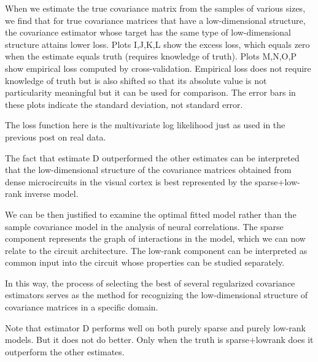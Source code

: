 When we estimate the true covariance matrix from the samples of various sizes, we find that for true covariance matrices that have a low-dimensional structure, the covariance estimator whose target has the same type of low-dimensional structure attains lower loss. Plots I,J,K,L show the excess loss, which equals zero when the estimate equals truth (requires knowledge of truth). Plots M,N,O,P show empirical loss computed by cross-validation.  Empirical loss does not require knowledge of truth but is also shifted so that its absolute value is not particularity meaningful but it can be used for comparison. The error bars in these plots indicate the standard deviation, not standard error.

The loss function here is the multivariate log likelihood just as used in the previous post on real data. 

The fact that estimate D outperformed the other estimates can be interpreted that the low-dimensional structure of the covariance matrices obtained from dense microcircuits in the visual cortex is best represented by the sparse+low-rank inverse model. 

We can be then justified to examine the optimal fitted model rather than the sample covariance model in the analysis of neural correlations.  The sparse component represents the graph of interactions in the model, which we can now relate to the circuit architecture.  The low-rank component can be interpreted as common input into the circuit whose properties can be studied separately.

In this way, the process of selecting the best of several regularized covariance estimators serves as the method for recognizing the low-dimensional structure of covariance matrices in a specific domain. 

Note that estimator D performs well on both purely sparse and purely low-rank models. But it does not do better.  Only when the truth is sparse+lowrank does it outperform the other estimates.
